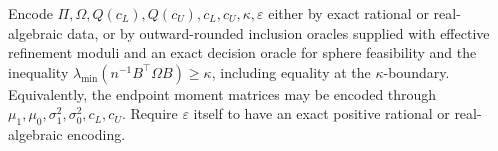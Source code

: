 Encode \(\Pi,\Omega,Q(c_L),Q(c_U),c_L,c_U,\kappa,\varepsilon\) either by exact rational or real-algebraic data, or by outward-rounded inclusion oracles supplied with effective refinement moduli and an exact decision oracle for sphere feasibility and the inequality \(\lambda_{\min}(n^{-1}B^{\top}\Omega B)\ge\kappa\), including equality at the \(\kappa\)-boundary.  Equivalently, the endpoint moment matrices may be encoded through \(\mu_1,\mu_0,\sigma_1^2,\sigma_0^2,c_L,c_U\).  Require \(\varepsilon\) itself to have an exact positive rational or real-algebraic encoding.